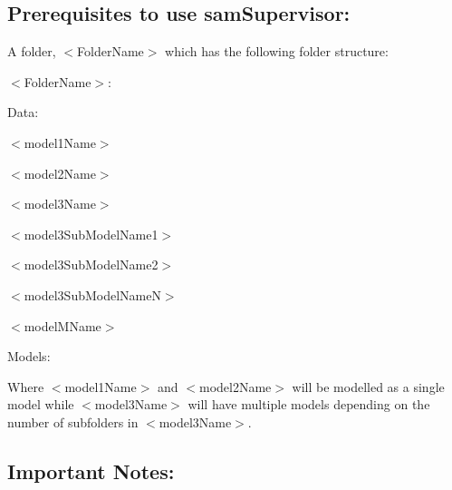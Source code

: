 \subsection*{Prerequisites to use sam\+Supervisor\+:}

A folder, {\ttfamily $<$Folder\+Name$>$} which has the following folder structure\+:

{\ttfamily $<$Folder\+Name$>$}\+:
\begin{DoxyItemize}
\item {\ttfamily Data\+:}
\begin{DoxyItemize}
\item {\ttfamily $<$model1\+Name$>$}
\item {\ttfamily $<$model2\+Name$>$}
\item {\ttfamily $<$model3\+Name$>$}
\begin{DoxyItemize}
\item {\ttfamily $<$model3\+Sub\+Model\+Name1$>$}
\item {\ttfamily $<$model3\+Sub\+Model\+Name2$>$}
\item {\ttfamily $<$model3\+Sub\+Model\+NameN$>$}
\end{DoxyItemize}
\item {\ttfamily $<$model\+M\+Name$>$}
\end{DoxyItemize}
\item {\ttfamily Models\+:}
\end{DoxyItemize}

Where {\ttfamily $<$model1\+Name$>$} and {\ttfamily $<$model2\+Name$>$} will be modelled as a single model while {\ttfamily $<$model3\+Name$>$} will have multiple models depending on the number of subfolders in {\ttfamily $<$model3\+Name$>$}.

\subsection*{Important Notes\+:}


